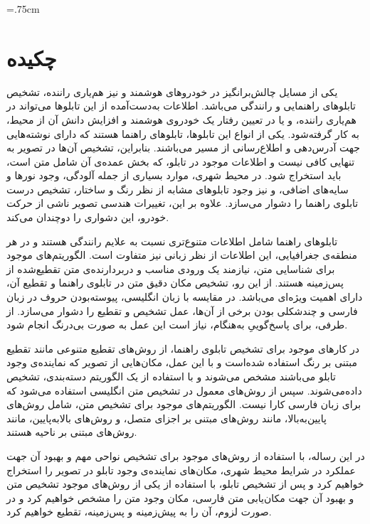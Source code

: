 \documentclass[12pt,a4paper]{article}
\newcommand{\nocontentsline}[3]{}
\newcommand{\tocless}[2]{\bgroup\let\addcontentsline=\nocontentsline#1{#2}\egroup}
\theoremstyle{definition}
\theoremstyle{theorem}
\theoremstyle{definition}
\begin{document}
\baselineskip=.75cm
\newpage 
{}
\tocless {\section*}{چکیده}
یکی از مسایل چالش‌برانگیز در خودروهای هوشمند و نیز هم‌یاری راننده‌، تشخیص تابلوهای راهنمایی و رانندگی می‌باشد. اطلاعات به‌دست‌آمده از این تابلوها می‌تواند در هم‌یاری راننده، و یا در تعیین رفتار یک خودروی هوشمند و افزایش دانش آن از محیط، به‌ کار گرفته‌شود. یکی از انواع این تابلوها، تابلوهای راهنما هستند که دارای نوشته‌هایی جهت آدرس‌دهی و اطلاع‌رسانی از مسیر می‌باشند. بنابراین، تشخیص آن‌ها در تصویر به تنهایی کافی نیست و اطلاعات موجود در تابلو، که بخش عمده‌ی آن شامل متن است، باید استخراج شود. در محیط شهری، موارد بسیاری از جمله آلودگی، وجود نورها و سایه‌های اضافی، و نیز وجود تابلوهای مشابه از نظر رنگ و ساختار، تشخیص درست تابلوی راهنما را دشوار می‌سازد. علاوه بر این، تغییرات هندسی تصویر ناشی از حرکت خودرو، این دشواری را دوچندان می‌کند.

تابلوهای راهنما شامل اطلاعات متنوع‌تری نسبت به علایم رانندگی هستند و در هر منطقه‌ی جغرافیایی، این اطلاعات از نظر زبانی نیز متفاوت است. الگوریتم‌های موجود برای شناسایی متن، نیازمند یک ورودی مناسب و دربردارنده‌ی متن تقطیع‌شده از پس‌زمینه هستند. از این رو، تشخیص مکان دقیق متن در تابلوی راهنما و تقطیع آن، دارای اهمیت ویژه‌ای می‌باشد. در مقایسه با زبان انگلیسی، پیوسته‌بودن حروف در زبان فارسی و چندشکلی بودن برخی از آن‌ها، عمل تشخیص و تقطیع را دشوار می‌سازد. از طرفی، برای پاسخ‌گوییِ به‌هنگام، نیاز است این عمل به صورت بی‌درنگ انجام شود.

در کارهای موجود برای تشخیص تابلوی راهنما، از روش‌های تقطیع متنوعی مانند تقطیع مبتنی بر رنگ استفاده شده‌است و با این عمل، مکان‌هایی از تصویر که نماینده‌ی وجود تابلو می‌باشند مشخص می‌شوند و با استفاده از یک الگوریتم دسته‌بندی، تشخیص داده‌می‌شوند. سپس از روش‌های معمول در تشخیص متن انگلیسی استفاده می‌شود که برای زبان فارسی کارا نیست. الگوریتم‌های موجود برای تشخیص متن، شامل روش‌های پایین‌به‌بالا، مانند روش‌های مبتنی بر اجزای متصل، و روش‌های بالابه‌پایین، مانند روش‌های مبتنی بر ناحیه هستند. 

در این رساله، با استفاده از روش‌های موجود برای تشخیص نواحی مهم و بهبود آن جهت عملکرد در شرایط محیط شهری، مکان‌های نماینده‌ی وجود تابلو در تصویر را استخراج خواهیم کرد و پس از تشخیص تابلو، با استفاده از یکی از روش‌های موجود تشخیص متن و بهبود آن جهت مکان‌یابی متن فارسی، مکان وجود متن را مشخص خواهیم کرد و در صورت لزوم، آن را به پیش‌زمینه و پس‌زمینه، تقطیع خواهیم کرد.
\end{document}
